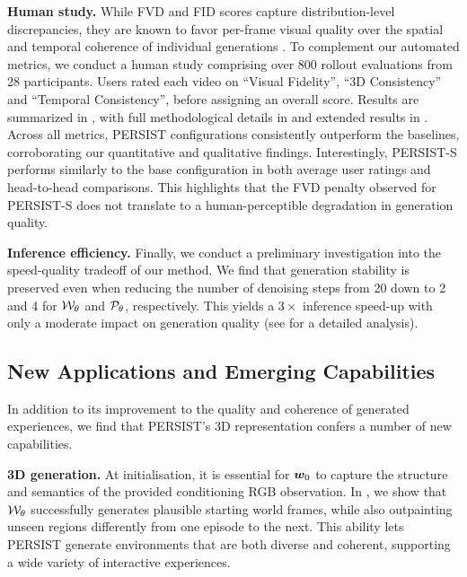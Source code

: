 \documentclass{article}
\theoremstyle{plain}
\theoremstyle{definition}
\theoremstyle{remark}
\begin{document}
\textbf{Human study.} While FVD and FID scores capture distribution-level discrepancies, they are known to favor per-frame visual quality over the spatial and temporal coherence of individual generations \citep{ge2024content}. To complement our automated metrics, we conduct a human study comprising over 800 rollout evaluations from 28 participants. Users rated each video on ``Visual Fidelity'', ``3D Consistency'' and ``Temporal Consistency'', before assigning an overall score. Results are summarized in , with full methodological details in  and extended results in . Across all metrics, PERSIST configurations consistently outperform the baselines, corroborating our quantitative and qualitative findings. Interestingly, PERSIST-S performs similarly to the base configuration in both average user ratings and head-to-head comparisons. This highlights that the FVD penalty observed for PERSIST-S does not translate to a human-perceptible degradation in generation quality.

\textbf{Inference efficiency.} Finally, we conduct a preliminary investigation into the speed-quality tradeoff of our method. We find that generation stability is preserved even when reducing the number of denoising steps from 20 down to 2 and 4 for ${\mathcal{W}}_\theta$ and ${\mathcal{P}}_\theta$, respectively. This yields a $3\times$ inference speed-up with only a moderate impact on generation quality (see  for a detailed analysis).





\subsection{New Applications and Emerging Capabilities}\label{sec:new_app}


In addition to its improvement to the quality and coherence of generated experiences, we find that PERSIST's 3D representation confers a number of new capabilities.

\textbf{3D generation.} At initialisation, it is essential for ${\bm{w}}_0$ to capture the structure and semantics of the provided conditioning RGB observation. In , we show that ${\mathcal{W}}_\theta$ successfully generates plausible starting world frames, while also outpainting unseen regions differently from one episode to the next. This ability lets PERSIST generate environments that are both diverse and coherent, supporting a wide variety of interactive experiences.
\end{document}
